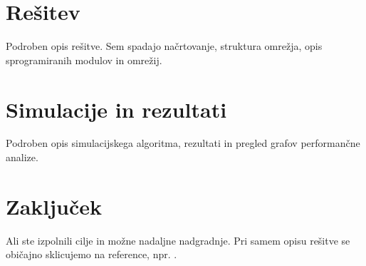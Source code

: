 \documentclass[11pt,a4paper,slovene]{myarticle}
\begin{document}
\section{Rešitev}
Podroben opis rešitve. Sem spadajo načrtovanje, struktura omrežja, opis sprogramiranih modulov in omrežij.

\section{Simulacije in rezultati}
Podroben opis simulacijskega algoritma, rezultati in pregled grafov performančne analize.

\section{Zaključek}
Ali ste izpolnili cilje in možne nadaljne nadgradnje. Pri samem opisu rešitve se običajno sklicujemo na reference, npr. \cite{omnetpp}. 

\pagebreak


\end{document}
